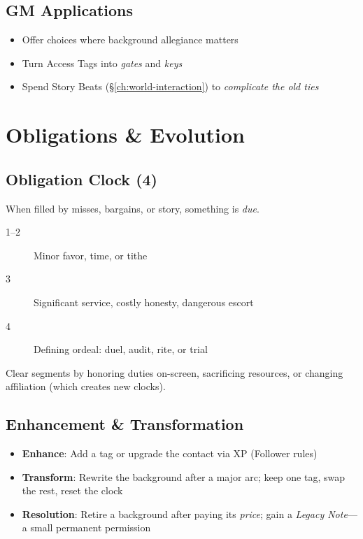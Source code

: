 \begin{multicols}{2}
\subsection*{GM Applications}
\begin{itemize}
\item Offer choices where background allegiance matters
\item Turn Access Tags into \emph{gates} and \emph{keys}
\item Spend Story Beats (\S\ref{ch:world-interaction}) to \emph{complicate the old ties}
\end{itemize}

\section{Obligations \& Evolution}
\label{sec:bg-obligation}

\subsection*{Obligation Clock (4)}
When filled by misses, bargains, or story, something is \emph{due}.
\begin{description}
\item[1--2] Minor favor, time, or tithe
\item[3] Significant service, costly honesty, dangerous escort
\item[4] Defining ordeal: duel, audit, rite, or trial
\end{description}
Clear segments by honoring duties on-screen, sacrificing resources, or changing affiliation (which creates new clocks).

\subsection*{Enhancement \& Transformation}
\begin{itemize}
\item \textbf{Enhance}: Add a tag or upgrade the contact via XP (Follower rules)
\item \textbf{Transform}: Rewrite the background after a major arc; keep one tag, swap the rest, reset the clock
\item \textbf{Resolution}: Retire a background after paying its \emph{price}; gain a \emph{Legacy Note}—a small permanent permission
\end{itemize}


\end{multicols}
